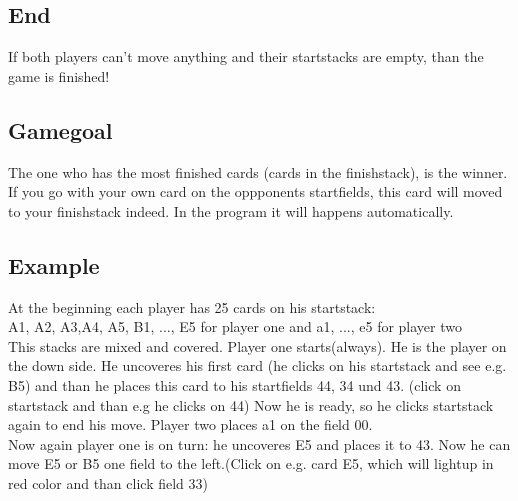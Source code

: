 \documentclass[12pt]{article}
\begin{document}
\subsection{End}
\label{ende}If both players can't move anything and their startstacks are empty, than the game is finished! \subsection{Gamegoal}
The one who has the most finished cards (cards in the finishstack), is the winner. If you go with your own card on the oppponents startfields, this card will moved to your finishstack indeed. In the program it will happens automatically.
\subsection{Example}
At the beginning each player has 25 cards on his startstack:\\ A1, A2, A3,A4, A5, B1, ..., E5 
for player one and a1, ..., e5 for player two\\ This stacks are mixed and covered. Player one starts(always). He is the player on the down side. He uncoveres his first card (he clicks on his startstack and see e.g. B5) and than he places this card to his startfields 44, 34 und 43. (click on startstack and than e.g he clicks on 44) Now he is ready, so he clicks startstack again to end his move. Player two places a1 on the field 00.\\
Now again player one is on turn: he uncoveres E5 and places it to 43. Now he can move E5 or B5 one field to the left.(Click on e.g. card E5, which will lightup in red color and than click field 33)
\newpage
\end{document}
